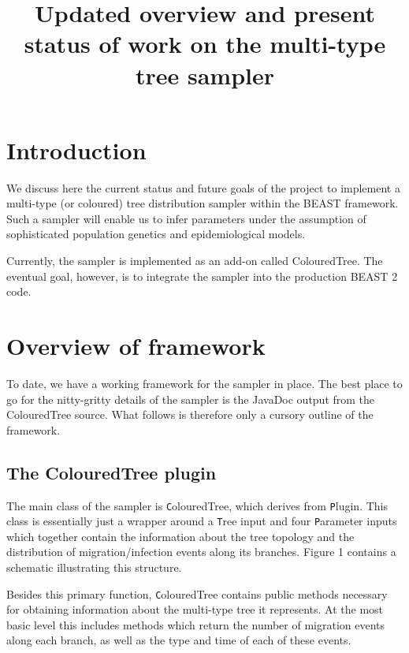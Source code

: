 \documentclass[a4paper,11pt]{article}
\newcommand{\class}[1]{{\texttt #1}}
\newcommand{\package}[1]{{\textsf #1}}
\begin{document}
\title{Updated overview and present status of work on the multi-type
  tree sampler}

\maketitle

\section{Introduction}

We discuss here the current status and future goals of the project
to implement a multi-type (or coloured) tree distribution sampler
within the BEAST framework. Such a sampler will enable us to infer
parameters under the assumption of sophisticated population genetics
and epidemiological models.

Currently, the sampler is implemented as an add-on called
\package{ColouredTree}. The eventual goal, however, is to integrate the
sampler into the production BEAST 2 code.


\section{Overview of framework}

To date, we have a working framework for the sampler in place.  The
best place to go for the nitty-gritty details of the sampler is the
JavaDoc output from the ColouredTree source.  What follows is
therefore only a cursory outline of the framework.


\subsection{The ColouredTree plugin}

The main class of the sampler is \class{ColouredTree}, which derives
from \class{Plugin}. This class is essentially just a wrapper around
a \class{Tree} input and four \class{Parameter} inputs which together
contain the information about the tree topology and the distribution
of migration/infection events along its branches.  Figure 1 contains a
schematic illustrating this structure.

Besides this primary function, \class{ColouredTree} contains public
methods necessary for obtaining information about the multi-type tree
it represents.  At the most basic level this includes methods which
return the number of migration events along each branch, as well as
the type and time of each of these events.
\end{document}
